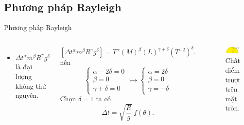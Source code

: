 \subsection{Phương pháp Rayleigh}
\begin{frame}{Phương pháp Rayleigh}
\vspace{-4mm}
\begin{columns}

    \begin{itemize}
        \item \(\Delta t^\alpha m^\beta R^\gamma g^\delta \) là đại lượng không thứ nguyên.
    \end{itemize}
    \begin{equation}
        \left[ \Delta t^\alpha m^\beta R^\gamma g^\delta \right] = T^\alpha (M)^\beta (L)^{\gamma + \delta} (T^{-2})^\delta.
    \end{equation}
    nên
    \begin{equation}
        \left\{ \begin{array}{l}
            \alpha - 2\delta = 0 \\
            \beta = 0 \\
            \gamma + \delta = 0
        \end{array} \right.
        \rightarrowtail \left\{ \begin{array}{l}
            \alpha = 2\delta \\
            \beta = 0 \\
            \gamma = -\delta
        \end{array} \right.
    \end{equation}
    Chọn \(\delta = 1\) ta có
    \begin{equation}
        \Delta t = \sqrt{\frac{R}{g}} \ f(\theta).
    \end{equation}

    \begin{figure}
        \centering
        \includegraphics[width=0.9\textwidth]{Figures/Circle_sliding.pdf}
        \caption{Chất điểm trượt trên mặt tròn.}
    \end{figure}
\end{columns}

\end{frame}

